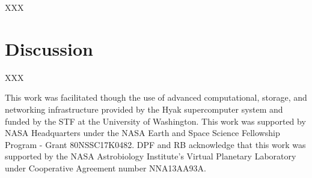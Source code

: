 \documentclass[twocolumn]{aastex61}
\def\lsim{~\rlap{$<$}{\lower 1.0ex\hbox{$\sim$}}}
\begin{document}
XXX



\section{Discussion} \label{sec:discussion}

XXX

\acknowledgments
This work was facilitated though the use of advanced computational, storage, and networking infrastructure provided by the Hyak supercomputer system and funded by the STF at the University of Washington. This work was supported by NASA Headquarters under the NASA Earth and Space Science Fellowship Program - Grant 80NSSC17K0482.  DPF and RB acknowledge that this work was supported by the NASA Astrobiology Institute's Virtual Planetary Laboratory under Cooperative Agreement number NNA13AA93A. 



\end{document}
